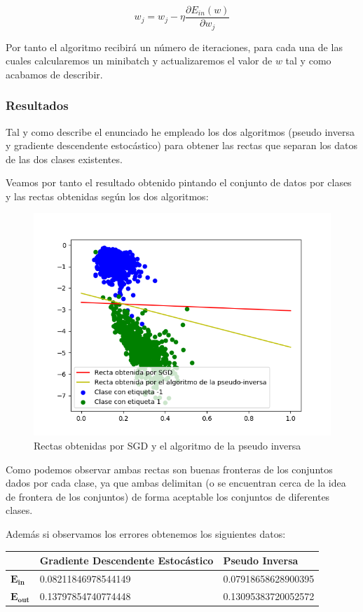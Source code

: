 \documentclass[12pt,a4paper]{article}
\begin{document}
$$w_j = w_j - \eta \frac{\partial E_{in}(w)}{\partial w_j}$$

Por tanto el algoritmo recibirá un número de iteraciones, para cada una de las cuales calcularemos un minibatch y actualizaremos el valor de $w$ tal y como acabamos de describir.

\subsubsection{Resultados}

Tal y como describe el enunciado he empleado los dos algoritmos (pseudo inversa y gradiente descendente estocástico) para obtener las rectas que separan los datos de las dos clases existentes.

Veamos por tanto el resultado obtenido pintando el conjunto de datos por clases y las rectas obtenidas según los dos algoritmos:

\begin{figure}[H]
	\centering
	\includegraphics[scale=0.8]{./Imagenes/ej2-1_w.png}
	\caption{Rectas obtenidas por SGD y el algoritmo de la pseudo inversa}
	\label{ej2-1_w}
\end{figure}

Como podemos observar ambas rectas son buenas fronteras de los conjuntos dados por cada clase, ya que ambas delimitan (o se encuentran cerca de la idea de frontera de los conjuntos) de forma aceptable los conjuntos de diferentes clases.

Además si observamos los errores obtenemos los siguientes datos:

\begin{table}[H]
	\begin{tabular}{|l|l|l|}
		\hline
		& \textbf{Gradiente Descendente Estocástico} & \textbf{Pseudo Inversa}      \\ \hline \hline
		$\mathbf{E_{in}}$  & 0.08211846978544149               & 0.07918658628900395 \\ \hline
		$\mathbf{E_{out}}$ & 0.13797854740774448               & 0.13095383720052572 \\ \hline
	\end{tabular}
\end{table}
\end{document}
